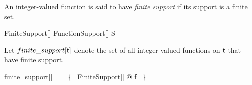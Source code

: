 \documentclass{amsart}
\begin{document}
An integer-valued function is said to have \textit{finite support} if its support is a finite set.

\begin{schema}{FiniteSupport}[\genT]
	FunctionSupport[\genT]
\where
	S \in \finset \genT
\end{schema}

Let $finite\_support[\mathsf{t}]$ denote the set of all integer-valued functions on $\mathsf{t}$ that have finite support.

\begin{zed}
	finite\_support[\genT] == \{~ FiniteSupport[\genT] @ f ~\}
\end{zed}

\begin{remark}
\end{remark}

\printbibliography
\end{document}
